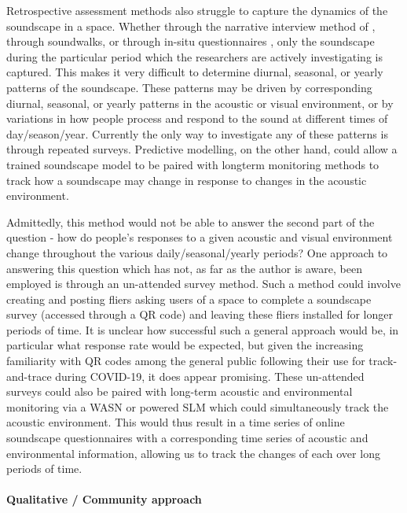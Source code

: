 Retrospective assessment methods also struggle to capture the dynamics of the soundscape in a space. Whether through the narrative interview method of , through soundwalks, or through in-situ questionnaires \citep{Mitchell2020Soundscape}, only the soundscape during the particular period which the researchers are actively investigating is captured. This makes it very difficult to determine diurnal, seasonal, or yearly patterns of the soundscape. These patterns may be driven by corresponding diurnal, seasonal, or yearly patterns in the acoustic or visual environment, or by variations in how people process and respond to the sound at different times of day/season/year. Currently the only way to investigate any of these patterns is through repeated surveys. Predictive modelling, on the other hand, could allow a trained soundscape model to be paired with longterm monitoring methods to track how a soundscape may change in response to changes in the acoustic environment.

Admittedly, this method would not be able to answer the second part of the question - how do people's responses to a given acoustic and visual environment change throughout the various daily/seasonal/yearly periods? One approach to answering this question which has not, as far as the author is aware, been employed is through an un-attended survey method. Such a method could involve creating and posting fliers asking users of a space to complete a soundscape survey (accessed through a QR code) and leaving these fliers installed for longer periods of time. It is unclear how successful such a general approach would be, in particular what response rate would be expected, but given the increasing familiarity with QR codes among the general public following their use for track-and-trace during COVID-19, it does appear promising. These un-attended surveys could also be paired with long-term acoustic and environmental monitoring via a WASN or powered SLM which could simultaneously track the acoustic environment. This would thus result in a time series of online soundscape questionnaires with a corresponding time series of acoustic and environmental information, allowing us to track the changes of each over long periods of time.

\paragraph*{Qualitative / Community approach}

